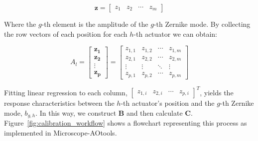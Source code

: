 \begin{equation}\label{eq:zernike_amp}
\boldsymbol{z} = 
\begin{bmatrix}
z_{1} & z_{2} & \cdots & z_{m} 
\end{bmatrix}
\end{equation}

Where the $g$-th element is the amplitude of the $g$-th Zernike mode. By collecting the row vectors of each position for each $h$-th actuator we can obtain:

\begin{equation}\label{eq:zernike_amp_actuator}
A_l = 
\begin{bmatrix}
\boldsymbol{z_{1}}\\
\boldsymbol{z_{2}}\\
\vdots\\
\boldsymbol{z_{p}} 
\end{bmatrix}
=
\begin{bmatrix}
z_{1,1} & z_{1,2} & \cdots & z_{1,m} \\
z_{2,1} & z_{2,2} & \cdots & z_{2,m} \\
\vdots  & \vdots  & \ddots & \vdots  \\
z_{p,1} & z_{p,2} & \cdots & z_{p,m} 
\end{bmatrix}
\end{equation}

Fitting linear regression to each column, $\begin{bmatrix} z_{1,i} & z_{2,i} & \cdots & z_{p,i} \end{bmatrix}^T$, yields the response characteristics between the $h$-th actuator's position and the $g$-th Zernike mode, $b_{g,h}$. In this way, we construct $\boldsymbol{B}$ and then calculate $\boldsymbol{C}$. Figure~\ref{fig:calibration_workflow} shows a flowchart representing this process as implemented in Microscope-AOtools.

